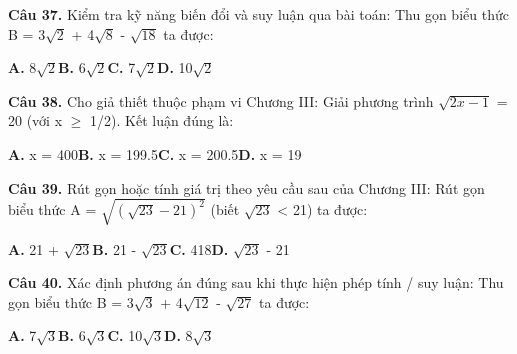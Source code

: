 \documentclass[11pt,a4paper]{article}
\begin{document}
\textbf{\color{primary} Câu 37.} Kiểm tra kỹ năng biến đổi và suy luận qua bài toán: Thu gọn biểu thức B = 3$\sqrt{2}$ + 4$\sqrt{8}$ - $\sqrt{18}$ ta được:\par
\hspace*{1.5em}\textbf{A.} 8$\sqrt{2}$\quad\quad \textbf{B.} 6$\sqrt{2}$\quad\quad \textbf{C.} 7$\sqrt{2}$\quad\quad \textbf{D.} 10$\sqrt{2}$\par\vspace{2pt}
\textbf{\color{primary} Câu 38.} Cho giả thiết thuộc phạm vi Chương III: Giải phương trình $\sqrt{2x - 1}$ = 20 (với x $\ge$ 1/2). Kết luận đúng là:\par
\hspace*{1.5em}\textbf{A.} x = 400\quad\quad \textbf{B.} x = 199.5\quad\quad \textbf{C.} x = 200.5\quad\quad \textbf{D.} x = 19\par\vspace{2pt}
\textbf{\color{primary} Câu 39.} Rút gọn hoặc tính giá trị theo yêu cầu sau của Chương III: Rút gọn biểu thức A = $\sqrt{(\sqrt{23} - 21)^2}$ (biết $\sqrt{23}$ < 21) ta được:\par
\hspace*{1.5em}\textbf{A.} 21 + $\sqrt{23}$\quad\quad \textbf{B.} 21 - $\sqrt{23}$\quad\quad \textbf{C.} 418\quad\quad \textbf{D.} $\sqrt{23}$ - 21\par\vspace{2pt}
\textbf{\color{primary} Câu 40.} Xác định phương án đúng sau khi thực hiện phép tính / suy luận: Thu gọn biểu thức B = 3$\sqrt{3}$ + 4$\sqrt{12}$ - $\sqrt{27}$ ta được:\par
\hspace*{1.5em}\textbf{A.} 7$\sqrt{3}$\quad\quad \textbf{B.} 6$\sqrt{3}$\quad\quad \textbf{C.} 10$\sqrt{3}$\quad\quad \textbf{D.} 8$\sqrt{3}$\par\vspace{2pt}
\end{document}

